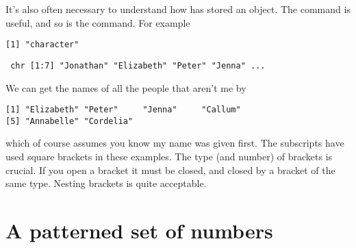 It's also often necessary to understand how \R{} has stored an object. The  command is useful, and so is the  command. For example 
\begin{knitrout}
\color{fgcolor}\begin{kframe}
\begin{alltt}
\hlstd{> }
\end{alltt}
\begin{verbatim}
[1] "character"
\end{verbatim}
\begin{alltt}
\hlstd{> }
\end{alltt}
\begin{verbatim}
 chr [1:7] "Jonathan" "Elizabeth" "Peter" "Jenna" ...
\end{verbatim}
\end{kframe}
\end{knitrout}
We can get the names of all the people that aren't me by 
\begin{knitrout}
\color{fgcolor}\begin{kframe}
\begin{alltt}
\hlstd{> }\hlstd{Names[}\hlopt{-}\hlstd{]}
\end{alltt}
\begin{verbatim}
[1] "Elizabeth" "Peter"     "Jenna"     "Callum"   
[5] "Annabelle" "Cordelia" 
\end{verbatim}
\end{kframe}
\end{knitrout}
which of course assumes you know my name was given first. The subscripts have used square brackets in these examples. The type (and number) of brackets is crucial. If you open a bracket it must be closed, and closed by a bracket of the same type. Nesting brackets is quite acceptable. 
 
 
\section{A patterned set of numbers} 
 
